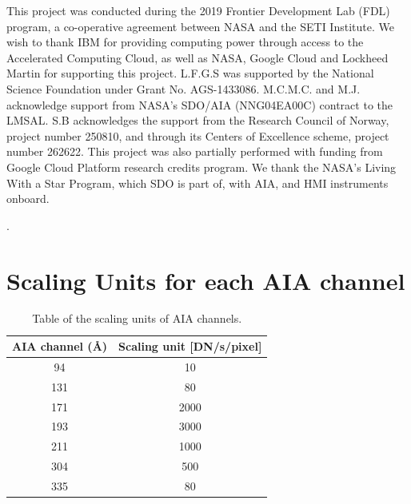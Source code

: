 \documentclass[twocolumn,usenames,dvipsnames]{aastex63}
\begin{document}
\acknowledgments

{This project was conducted during the 2019 Frontier Development Lab (FDL) program, a co-operative agreement between NASA and the SETI Institute. We wish to thank IBM for providing computing power through access to the Accelerated Computing Cloud, as well as NASA, Google Cloud and Lockheed Martin for supporting this project. L.F.G.S was supported by the National Science Foundation under Grant No. AGS-1433086. M.C.M.C. and M.J. acknowledge support from NASA’s SDO/AIA (NNG04EA00C) contract to the LMSAL. S.B  acknowledges the support from the Research Council of Norway, project number 250810, and through its Centers of Excellence scheme, project number 262622. This project was also partially performed with funding from Google Cloud Platform research credits program. We thank the NASA’s Living With a Star Program, which SDO is part of, with AIA, and HMI instruments onboard.

.}






\newpage
\appendix
\section{Scaling Units for each AIA channel}
\label{section:appendix_average}

\begin{table}[ht]
  \centering
  \caption{Table of the scaling units of  AIA channels.}
  \label{tab:average_channels}
  \begin{tabular}{cc}
    \toprule
     AIA channel (\AA) &  Scaling unit [DN/s/pixel] \\
     \midrule
       94 &   10  \\
      131 &   80  \\
      171 & 2000  \\
      193 & 3000  \\
      211 & 1000  \\
      304 &  500  \\
      335 &   80  \\
      \bottomrule
  \end{tabular}
\end{table}
\end{document}
